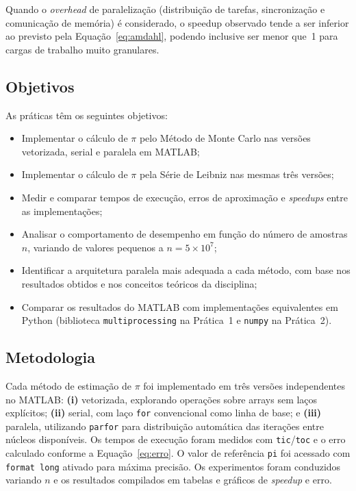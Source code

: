 \documentclass[12pt, a4paper]{article}
\begin{document}
	\noindent Quando o \textit{overhead} de paralelização (distribuição de tarefas,
	sincronização e comunicação de memória) é considerado, o speedup observado tende
	a ser inferior ao previsto pela Equação~\eqref{eq:amdahl}, podendo inclusive ser
	menor que~1 para cargas de trabalho muito granulares.
	
	\subsection{Objetivos}
	
	As práticas têm os seguintes objetivos:
	
	\begin{itemize}
		\item Implementar o cálculo de $\pi$ pelo Método de Monte Carlo nas versões
		vetorizada, serial e paralela em MATLAB;
		\item Implementar o cálculo de $\pi$ pela Série de Leibniz nas mesmas três
		versões;
		\item Medir e comparar tempos de execução, erros de aproximação e
		\textit{speedups} entre as implementações;
		\item Analisar o comportamento de desempenho em função do número de amostras
		$n$, variando de valores pequenos a $n = 5\times10^7$;
		\item Identificar a arquitetura paralela mais adequada a cada método, com base
		nos resultados obtidos e nos conceitos teóricos da disciplina;
		\item Comparar os resultados do MATLAB com implementações equivalentes em Python
		(biblioteca \texttt{multiprocessing} na Prática~1 e \texttt{numpy} na
		Prática~2).
	\end{itemize}
	
	\subsection{Metodologia}
	
	Cada método de estimação de $\pi$ foi implementado em três versões independentes
	no MATLAB: \textbf{(i)} vetorizada, explorando operações sobre arrays sem laços
	explícitos; \textbf{(ii)} serial, com laço \texttt{for} convencional como linha
	de base; e \textbf{(iii)} paralela, utilizando \texttt{parfor} para distribuição
	automática das iterações entre núcleos disponíveis. Os tempos de execução foram
	medidos com \texttt{tic}/\texttt{toc} e o erro calculado conforme a
	Equação~\eqref{eq:erro}. O valor de referência \texttt{pi} foi acessado com
	\texttt{format long} ativado para máxima precisão. Os experimentos foram
	conduzidos variando $n$ e os resultados compilados em tabelas e gráficos de
	\textit{speedup} e erro.
	
\end{document}
